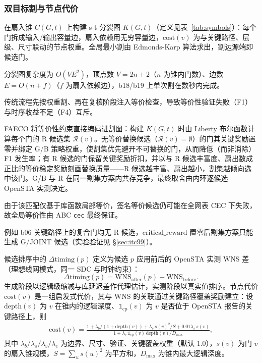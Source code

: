 \documentclass[journal]{IEEEtran}
\begin{document}
\subsubsection{双目标割与节点代价}
在扇入锥 $C(G, t)$ 上构建 s-t 分裂图 $K(G, t)$（定义见表~\ref{tab:symbols}）：每个门拆成输入/输出容量边，扇入依赖用无穷容量边，$\mathrm{cost}(v)$ 为与关键路径、层级、尺寸联动的节点权重。全局最小割由 Edmonds-Karp 算法求出，割边源端即候选门。

分裂图复杂度为 $O(VE^2)$，顶点数 $V=2n+2$（$n$ 为锥内门数）、边数 $E=O(n+f)$（$f$ 为扇入依赖边），b18/b19 上单次割在数秒内完成。

传统流程先按权重割、再在复核阶段注入等价检查，导致等价性验证失败（F1）与时序收益不足（F4）互斥。

FAECO 将等价性约束直接编码进割图：构建 $K(G, t)$ 时由 Liberty 布尔函数计算每个门的 R 候选集 $\mathcal{R}(v)$。无等价替换候选（$\mathcal{R}(v)=\emptyset$）的门其关键奖励置零并绑定 G/B 策略权重，使割集优先避开不可替换的门，从而降低（而非消除）F1 发生率；有 R 候选的门保留关键奖励折扣，并以与 R 候选丰富度、扇出数成正比的等价稳定奖励刻画替换质量——R 候选越丰富、扇出越小，割集越倾向选中该门。G/B 与 R 在同一割集方案内共存竞争，最终取舍由内环逐候选 OpenSTA 实测决定。

由于该匹配仅基于库函数局部等价，签名等价候选仍可能在全网表 CEC 下失败，故全局等价性由 ABC \texttt{cec} 最终保证。

例如 b06 关键路径上的复合门均无 R 候选，$\mathrm{critical\_reward}$ 置零后割集方案只能生成 G/JOINT 候选（实验验证见 \S\ref{sec:itc99}）。

候选排序中的 $\Delta\mathrm{timing}(p)$ 定义为候选 $p$ 应用前后的 OpenSTA 实测 WNS 差（理想线网模式，同一 SDC 与时钟约束）：
\begin{equation}\label{eq:dtiming}
\Delta\mathrm{timing}(p) = \mathrm{WNS}_{\mathrm{after}}(p) - \mathrm{WNS}_{\mathrm{before}}.
\end{equation}
生成阶段以逻辑级缩减与库延迟差作代理估计，实测阶段以真实值排序。节点代价 $\mathrm{cost}(v)$ 是一组启发式代价，其与 WNS 的关联通过关键路径覆盖奖励建立：设 $\mathrm{depth}(v)$ 为 $v$ 在锥内的逻辑深度、$\mathbb{1}_{\mathrm{cp}}(v)$ 为 $v$ 是否位于 OpenSTA 报告的关键路径上，则
{\small
\begin{equation}
\label{eq:cost}
\begin{split}
\mathrm{cost}(v) = \frac{1 + \lambda_b/(1+\mathrm{depth}(v)) + \lambda_s\,s(v)^2/S + 0.01\lambda_v\,s(v)}{1 + \lambda_c\,\mathbb{1}_{\mathrm{cp}}(v)\,\mathrm{depth}(v)/D_{\max}},
\end{split}
\end{equation}
}
其中 $\lambda_b/\lambda_s/\lambda_v/\lambda_c$ 为边界、尺寸、验证、关键覆盖权重（默认 $1.0$），$s(v)$ 为门 $v$ 的扇入锥规模，$S=\sum_u s(u)^2$ 为平方和，$D_{\max}$ 为锥内最大逻辑深度。
\end{document}
